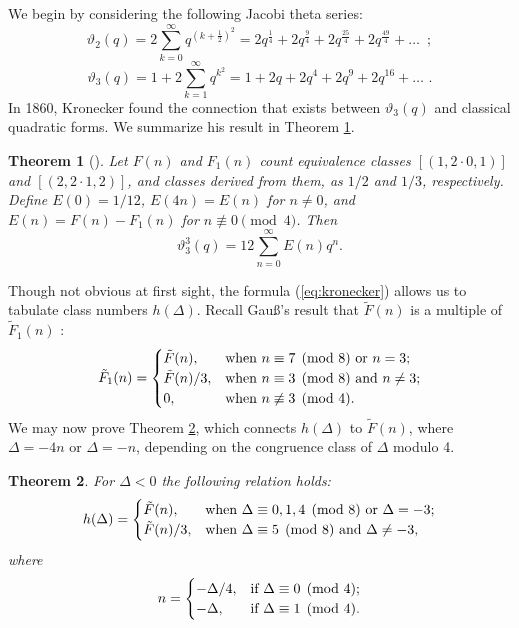 \documentclass{mcom-l}
\newtheorem{thm}{Theorem}[section]
\theoremstyle{definition}
\begin{document}
We begin by considering the following Jacobi theta series:
$$
\vartheta_2(q) = 2\sum_{k = 0}^\infty q^{\left(k + \frac{1}{2}\right)^2} = 2q^{\frac{1}{4}} + 2q^{\frac{9}{4}} + 2q^{\frac{25}{4}} +  2q^{\frac{49}{4}} + \ldots\,\,\,;
$$ 
$$
\vartheta_3(q) = 1 + 2\sum_{k = 1}^\infty q^{k^2} = 1 + 2q + 2q^4 + 2q^9 + 2q^{16} + \ldots \,\,.
$$ 
In 1860, Kronecker found the connection that exists between
$\vartheta_3(q)$ and classical quadratic forms. We summarize his
result in Theorem \ref{thm:kronecker}.
\begin{thm}[{\cite{kronecker}}]\label{thm:kronecker}
Let $F(n)$ and $F_1(n)$ count equivalence classes $\left[(1,2\!\cdot\!
  0, 1)\right]$ and $[(2, 2\!\cdot\! 1, 2)]$, and classes derived from
them, as $1/2$ and $1/3$, respectively. Define $E(0) = 1/12$, $E(4n) =
E(n)$ for $n \neq 0$, and $E(n) = F(n) - F_1(n)$ for $n \not \equiv 0
\pmod{4}$. Then
\begin{equation} \label{eq:kronecker}
\vartheta_3^3(q) = 12\sum\limits_{n = 0}^\infty E(n)q^n.
\end{equation}
\end{thm}
Though not obvious at first sight, the formula (\ref{eq:kronecker})
allows us to tabulate class numbers $h(\Delta)$. Recall Gau\ss's result
that $\tilde{F}(n)$ is a multiple of $\tilde{F}_1(n)$
\cite[]{gauss}:
\begin{equation} \label{eq:F1_and_F}
\tilde{F}_1(n) = \begin{cases}
\tilde{F}(n), & \textnormal{when $n \equiv 7 \pmod{8}$ or $n = 3$};\\
\tilde{F}(n)/3, & \textnormal{when $n \equiv 3 \pmod{8}$ and $n \neq 3$};\\
0, & \textnormal{when $n \not \equiv 3 \pmod{4}$.}
\end{cases}
\end{equation}
We may now prove Theorem \ref{thm:h_and_F}, which connects $h(\Delta)$
to $\tilde{F}(n)$, where $\Delta = -4n$ or $\Delta = -n$, depending on
the congruence class of $\Delta$ modulo 4.
\begin{thm} \label{thm:h_and_F}
For $\Delta < 0$ the following relation holds:
\begin{equation} \label{eq:h}
h(\Delta) = \begin{cases}
\tilde{F}(n), & \textnormal{when $\Delta \equiv 0, 1, 4 \pmod{8}$ or $\Delta = -3$};\\
\tilde{F}(n)/3, & \textnormal{when $\Delta \equiv 5 \pmod{8}$ and $\Delta \neq -3$},
\end{cases}
\end{equation}
where
\begin{equation} \label{eq:n_delta}
n = \begin{cases}
-\Delta / 4, & \textnormal{if $\Delta \equiv 0 \pmod{4}$;}\\
-\Delta, & \textnormal{if $\Delta \equiv 1 \pmod{4}$.}
\end{cases}
\end{equation}
\end{thm}
\end{document}
